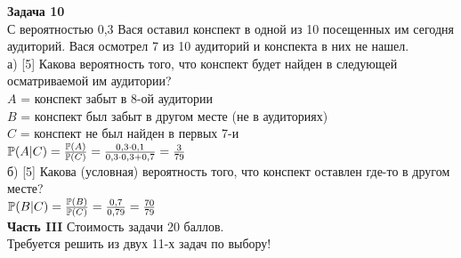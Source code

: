 \documentclass[12pt, a4paper]{article}\usepackage[]{graphicx}\usepackage[]{color}
\begin{document}
	{\bf Задача 10} \\
	С вероятностью 0,3 Вася оставил конспект в одной из 10 посещенных
	им сегодня аудиторий. Вася осмотрел 7 из 10 аудиторий и конспекта
	в них не нашел. \\
	а) [5] Какова вероятность того, что конспект будет найден в
	следующей
	осматриваемой им аудитории? \\
	$A$ = конспект забыт в 8-ой аудитории \\
	$B$ = конспект был забыт в другом месте (не в аудиториях) \\
	$C$ = конспект не был найден в первых 7-и \\
	$\P(A|C)=\frac{\P(A)}{\P(C)}=\frac{0,3\cdot 0,1}{0,3\cdot
		0,3+0,7}=\frac{3}{79}$ \\
	б) [5] Какова (условная) вероятность того, что конспект оставлен
	где-то в другом месте? \\
	$\P(B|C)=\frac{\P(B)}{\P(C)}=\frac{0,7}{0,79}=\frac{70}{79}$ \\

	{\bf Часть III} Стоимость задачи 20 баллов. \\

	Требуется решить {\bf {}} из двух 11-х задач по
	выбору! \\
\end{document}
